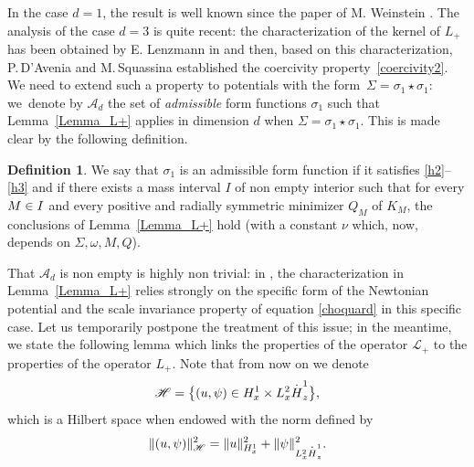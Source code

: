 \documentclass[11pt]{article}
\DeclareRobustCommand{\accentset}[2]{\overset{#1}{#2}}
\theoremstyle{definition}
\newtheorem{defin}[lemma]{Definition}
\newcommand*{\overbigdot}[1]{%
\accentset{\mbox{\large\bfseries .}}{#1}}
\begin{document}
In the case $d=1$, the result is well known since the paper of M. Weinstein \cite{Weinstein1}. The analysis of the case $d=3$ is quite recent: the characterization of the kernel of $L_{+}$ has been obtained by E. Lenzmann in \cite[Th.\,4]{Lenzmann} and then, based on this characterization, P.\,D'Avenia and M.\,Squassina \cite[Lem.\,2.7]{Avenia_Squassina} established the coercivity property~\eqref{coercivity2}.
We need to extend such a property to potentials with the form~\hbox{$\Sigma=\sigma_{1}\star\sigma_{1}$}:
we~\hbox{denote} by $\mathscr{A}_{d}$ the set of \emph{admissible} form functions
$\sigma_{1}$ such that Lemma~\ref{Lemma_L+} applies in dimension $d$ when $\Sigma=\sigma_{1}\star\sigma_{1}$.
This is made clear by the following definition.

\begin{defin}\label{d:adm}
We say that $\sigma_{1}$ is an admissible form function if it satisfies \eqref{h2}--\eqref{h3} and if there exists a mass interval $I$ of non empty interior such that for every $M\in\nobreak I$ and every positive and radially symmetric minimizer $Q_{M}$ of $K_{M}$,
the conclusions of
Lemma~\ref{Lemma_L+} hold (with a constant $\nu$ which, now, depends on $\Sigma, \omega, M, Q$).
\end{defin}

That $\mathscr{A}_{d}$ is non empty is highly non trivial: in \cite{Lenzmann}, the characterization in Lemma~\ref{Lemma_L+} relies strongly
on the specific form of the Newtonian potential and the scale invariance property of equation \eqref{choquard} in this specific case. Let us temporarily postpone the treatment of this issue; in the meantime, we
state the following lemma which links the properties of the operator $\mathcal{L}_{+}$ to the properties of the operator $L_{+}$. Note that from now on we denote
\[
\mathscr{H}=\bigl \{(u,\psi) \in H_{x}^{1}\times L_{x}^{2}\overbigdot{H}_{z}^{1}\bigr\},
\]
which is a Hilbert space when endowed with the norm defined by
\[
\|(u,\psi) \|_{\mathscr{H}}^{2}=\|u\|_{H_{x}^{1}}^{2}+\|\psi\|_{L_{x}^{2}\overbigdot{H}_{z}^{1}}^{2}.
\]
\end{document}

